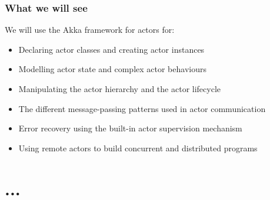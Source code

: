 \documentclass[aspectratio=169]{beamer}
\begin{document}
\begin{frame}[t]\frametitle{What we will see}

  We will use the Akka framework for actors for:
  \begin{itemize}
    \item Declaring \alert{actor classes} and creating \alert{actor instances}
    \item Modelling \alert{actor state} and complex \alert{actor behaviours}
    \item Manipulating the \alert{actor hierarchy} and the \alert{actor lifecycle}
    \item The different message-passing patterns used in \alert{actor communication}
    \item Error recovery using the built-in \alert{actor supervision} mechanism
    \item Using \alert{remote actors} to build concurrent and distributed programs
  \end{itemize}


\end{frame}

\section{...}
\end{document}
